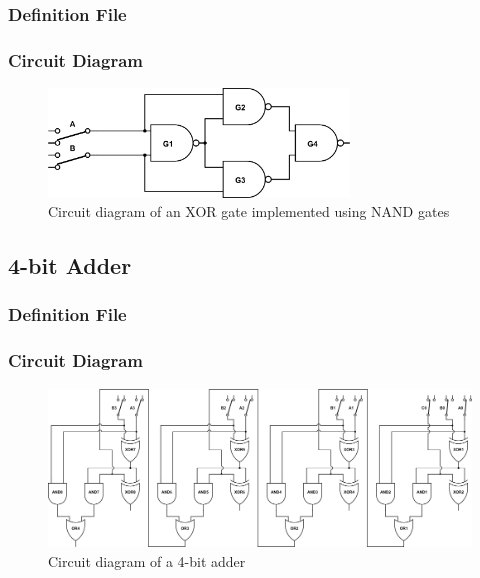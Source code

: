 \documentclass[a4paper,10pt]{article}
\begin{document}
\subsubsection{Definition File}


\subsubsection{Circuit Diagram}
\begin{figure}[h]
 \centering
 \includegraphics[width=8cm]{../../examples/xor.png}
 \caption{Circuit diagram of an XOR gate implemented using NAND gates}
 \label{fig:example-xor}
\end{figure}

\subsection{4-bit Adder}

\subsubsection{Definition File}


\subsubsection{Circuit Diagram}
\begin{figure}[h]
 \centering
 \includegraphics[width=14cm]{../../examples/4-bit-adder.png}
 \caption{Circuit diagram of a 4-bit adder}
 \label{fig:example-adder}
\end{figure}
\end{document}
